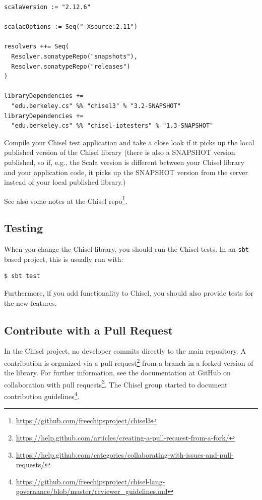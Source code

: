 \documentclass[%
    10pt,
    headinclude, footexclude,
    openright, %
    notitlepage,
    cleardoubleempty,
    headsepline,
    pointlessnumbers,
    bibtotoc, idxtotoc,
    ]{scrbook}
\newcommand{\code}[1]{{\small{\texttt{#1}}}}
\newcommand{\myref}[2]{\href{#1}{#2}}
\renewcommand{\myref}[2]{{#2}{\footnote{\url{#1}}}}
\begin{document}
\begin{verbatim}
scalaVersion := "2.12.6"

scalacOptions := Seq("-Xsource:2.11")

resolvers ++= Seq(
  Resolver.sonatypeRepo("snapshots"),
  Resolver.sonatypeRepo("releases")
)

libraryDependencies +=
  "edu.berkeley.cs" %% "chisel3" % "3.2-SNAPSHOT"
libraryDependencies +=
  "edu.berkeley.cs" %% "chisel-iotesters" % "1.3-SNAPSHOT"
\end{verbatim}

Compile your Chisel test application and take a close look if it picks up the local published
version of the Chisel library (there is also a SNAPSHOT version published, so if, e.g.,
the Scala version is different between your Chisel library and your application code,
it picks up the SNAPSHOT version from the server instead of your local published
library.)

See also \myref{https://github.com/freechipsproject/chisel3}{some notes
at the Chisel repo}.

\subsection{Testing}

When you change the Chisel library, you should run the Chisel tests.
In an \code{sbt} based project, this is usually run with:

\begin{verbatim}
$ sbt test
\end{verbatim}

Furthermore, if you add functionality to Chisel, you should also provide tests for the
new features.

\subsection{Contribute with a Pull Request}

In the Chisel project, no developer commits directly to the main repository.
A contribution is organized via a
\myref{https://help.github.com/articles/creating-a-pull-request-from-a-fork/}{pull request}
from a branch in a forked version of the library.
For further information, see the documentation at GitHub on
\myref{https://help.github.com/categories/collaborating-with-issues-and-pull-requests/}{collaboration with
pull requests}.
The Chisel group started to document
\myref{https://github.com/freechipsproject/chisel-lang-governance/blob/master/reviewer_guidelines.md}{contribution
guidelines}.
\end{document}
